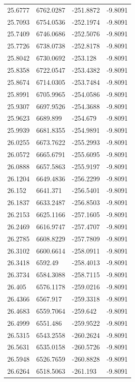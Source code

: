 \begin{table}[H]
\begin{tabular}{llll}
25.6777 & 6762.0287 & -251.8872 & -9.8091 \\
25.7093 & 6754.0536 & -252.1974 & -9.8091 \\
25.7409 & 6746.0686 & -252.5076 & -9.8091 \\
25.7726 & 6738.0738 & -252.8178 & -9.8091 \\
25.8042 & 6730.0692 & -253.128 & -9.8091 \\
25.8358 & 6722.0547 & -253.4382 & -9.8091 \\
25.8674 & 6714.0305 & -253.7484 & -9.8091 \\
25.8991 & 6705.9965 & -254.0586 & -9.8091 \\
25.9307 & 6697.9526 & -254.3688 & -9.8091 \\
25.9623 & 6689.899 & -254.679 & -9.8091 \\
25.9939 & 6681.8355 & -254.9891 & -9.8091 \\
26.0255 & 6673.7622 & -255.2993 & -9.8091 \\
26.0572 & 6665.6791 & -255.6095 & -9.8091 \\
26.0888 & 6657.5863 & -255.9197 & -9.8091 \\
26.1204 & 6649.4836 & -256.2299 & -9.8091 \\
26.152 & 6641.371 & -256.5401 & -9.8091 \\
26.1837 & 6633.2487 & -256.8503 & -9.8091 \\
26.2153 & 6625.1166 & -257.1605 & -9.8091 \\
26.2469 & 6616.9747 & -257.4707 & -9.8091 \\
26.2785 & 6608.8229 & -257.7809 & -9.8091 \\
26.3102 & 6600.6614 & -258.0911 & -9.8091 \\
26.3418 & 6592.49 & -258.4013 & -9.8091 \\
26.3734 & 6584.3088 & -258.7115 & -9.8091 \\
26.405 & 6576.1178 & -259.0216 & -9.8091 \\
26.4366 & 6567.917 & -259.3318 & -9.8091 \\
26.4683 & 6559.7064 & -259.642 & -9.8091 \\
26.4999 & 6551.486 & -259.9522 & -9.8091 \\
26.5315 & 6543.2558 & -260.2624 & -9.8091 \\
26.5631 & 6535.0158 & -260.5726 & -9.8091 \\
26.5948 & 6526.7659 & -260.8828 & -9.8091 \\
26.6264 & 6518.5063 & -261.193 & -9.8091 \\

\end{tabular}
\end{table}

